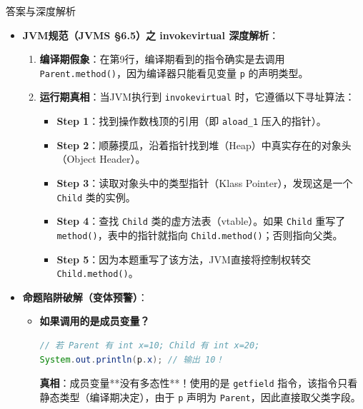 \documentclass[12pt, a4paper]{ctexart}
\begin{document}
\begin{enumerate}[label=\textbf{\arabic*.}]
\begin{bluebox}{答案与深度解析}
\begin{itemize}[leftmargin=*]
			      \item \textbf{JVM规范（JVMS §6.5）之 invokevirtual 深度解析}：
			            \begin{enumerate}
				            \item \textbf{编译期假象}：在第9行，编译期看到的指令确实是去调用 \texttt{Parent.method()}，因为编译器只能看见变量 \texttt{p} 的声明类型。
				            \item \textbf{运行期真相}：当JVM执行到 \texttt{invokevirtual} 时，它遵循以下寻址算法：
				                  \begin{itemize}
					                  \item \textbf{Step 1}：找到操作数栈顶的引用（即 \texttt{aload\_1} 压入的指针）。
					                  \item \textbf{Step 2}：顺藤摸瓜，沿着指针找到堆（Heap）中真实存在的对象头（Object Header）。
					                  \item \textbf{Step 3}：读取对象头中的类型指针（Klass Pointer），发现这是一个 \texttt{Child} 类的实例。
					                  \item \textbf{Step 4}：查找 \texttt{Child} 类的虚方法表（vtable）。如果 \texttt{Child} 重写了 \texttt{method()}，表中的指针就指向 \texttt{Child.method()}；否则指向父类。
					                  \item \textbf{Step 5}：因为本题重写了该方法，JVM直接将控制权转交 \texttt{Child.method()}。
				                  \end{itemize}
			            \end{enumerate}

			      \item \textbf{命题陷阱破解（变体预警）}：
			            \begin{itemize}
				            \item \textbf{如果调用的是成员变量？}
				                  \begin{lstlisting}[language=Java]
// 若 Parent 有 int x=10; Child 有 int x=20; 
System.out.println(p.x); // 输出 10！
                  \end{lstlisting}
				                  \textbf{真相}：成员变量**没有多态性**！使用的是 \texttt{getfield} 指令，该指令只看静态类型（编译期决定），由于 \texttt{p} 声明为 \texttt{Parent}，因此直接取父类字段。
			            \end{itemize}
		      \end{itemize}


\end{bluebox}
\end{enumerate}
\end{document}
